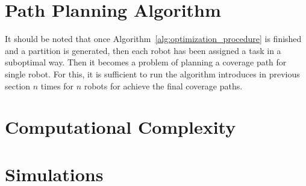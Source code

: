\documentclass[../main.tex]{subfiles}
\begin{document}
%


\section{Path Planning Algorithm}
It should be noted that once Algorithm~\ref{alg:optimization_procedure} is finished and a partition is generated, then each robot has been assigned a task in a suboptimal way. Then it becomes a problem of planning a coverage path for single robot. For this, it is sufficient to run the algorithm introduces in previous section $n$ times for $n$ robots for achieve the final coverage paths.



\section{Computational Complexity}
\label{section:multi_comp_analysis}

\section{Simulations}
\label{section:multi_simulations}
\end{document}
